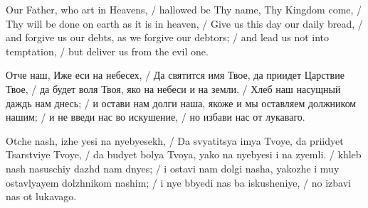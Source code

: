 \begin{liturgicaltext}
    \choir Our Father, who art in Heavens, / hallowed be Thy name, Thy Kingdom come, / Thy will be done on earth as it is in heaven, / Give us this day our daily bread, / and forgive us our debts, as we forgive our debtors; / and lead us not into temptation, / but deliver us from the evil one.
    \item[] Отче наш, Иже еси на небесех, / Да святится имя Твое, да приидет Царствие Твое, / да будет воля Твоя, яко на небеси и на земли. / Хлеб наш насущный даждь нам днесь; / и остави нам долги наша, якоже и мы оставляем должником нашим; / и не введи нас во искушение, / но избави нас от лукаваго.
    \item[] Otche nash, izhe yesi na nyebyesekh, / Da svyatitsya imya Tvoye, da priidyet Tsarstviye Tvoye, / da budyet bolya Tvoya, yako na nyebyesi i na zyemli. / khleb nash nasuschiy dazhd nam dnyes; / i ostavi nam dolgi nasha, yakozhe i muy ostavlyayem dolzhnikom nashim; / i nye bbyedi nas ba iskusheniye, / no izbavi nas ot lukavago.
\end{liturgicaltext}